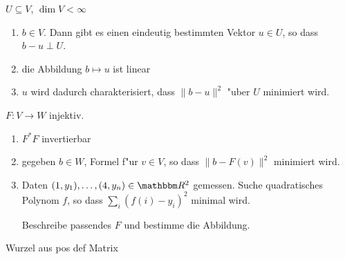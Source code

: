 \documentclass[a4,11pt]{article}
\begin{document}
\vspace*{-17mm}
{
\kopf
}



\begin{aufgabe}[4 Punkte]
  $U \subseteq V$, $\dim V < \infty$
  
  \begin{enumerate}
  \item $b \in V$.
  Dann gibt es einen eindeutig bestimmten Vektor $u \in U$, so dass $b-u \perp U$.
  \item die Abbildung $b \mapsto u$ ist linear
  \item $u$ wird dadurch charakterisiert, dass $\| b - u \|^2$ "uber $U$ minimiert wird.
\end{enumerate}
\end{aufgabe}

\begin{aufgabe}[4 Punkte]
  $F \colon V \to W$ injektiv.
  \begin{enumerate}
  \item $F^*F$ invertierbar
  \item gegeben $b \in W$, Formel f"ur $v \in V$, so dass $\| b - F(v) \|^2$ minimiert wird.
  \item Daten $(1,y_1), \ldots, (4,y_n) \in \R^2$ gemessen.
    Suche quadratisches Polynom $f$, so dass $\sum_i (f(i)-y_i)^2$ minimal wird.

    Beschreibe passendes $F$ und bestimme die Abbildung.
  \end{enumerate}
\end{aufgabe}

\begin{aufgabe}[4 Punkte]
Wurzel aus pos def Matrix
\end{aufgabe}

\end{document}
